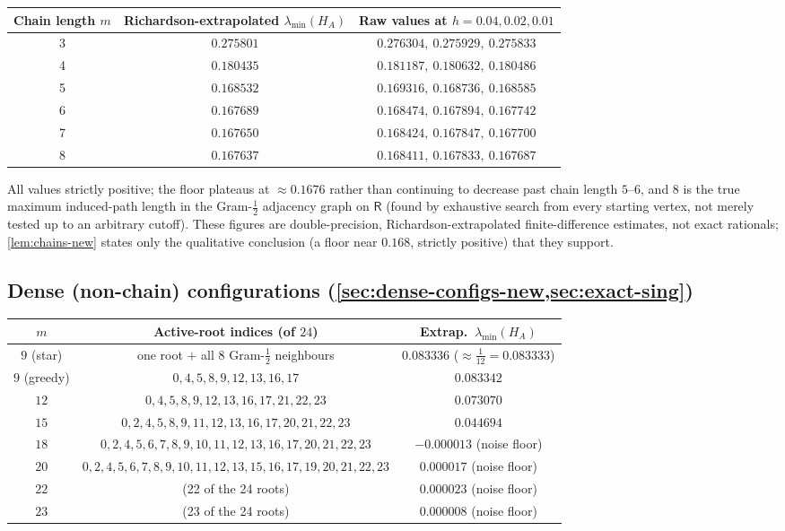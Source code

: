 \documentclass[11pt,reqno]{amsart}
\renewcommand{\_}{\origunderscore\allowbreak}
\numberwithin{equation}{section}
\theoremstyle{plain}
\theoremstyle{definition}
\theoremstyle{remark}
\newcommand{\Rt}{\mathsf{R}}                 %
\begin{document}
\begin{center}
\renewcommand{\arraystretch}{1.2}
\begin{tabular}{ccc}
\toprule
Chain length $m$ & Richardson-extrapolated $\lambda_{\min}(H_A)$ & Raw values at $h=0.04,0.02,0.01$\\
\midrule
3 & $0.275801$ & $0.276304,\ 0.275929,\ 0.275833$\\
4 & $0.180435$ & $0.181187,\ 0.180632,\ 0.180486$\\
5 & $0.168532$ & $0.169316,\ 0.168736,\ 0.168585$\\
6 & $0.167689$ & $0.168474,\ 0.167894,\ 0.167742$\\
7 & $0.167650$ & $0.168424,\ 0.167847,\ 0.167700$\\
8 & $0.167637$ & $0.168411,\ 0.167833,\ 0.167687$\\
\bottomrule
\end{tabular}
\end{center}

All values strictly positive; the floor plateaus at $\approx0.1676$
rather than continuing to decrease past chain length $5$--$6$, and $8$
is the true maximum induced-path length in the Gram-$\tfrac12$
adjacency graph on $\Rt$ (found by exhaustive search from every
starting vertex, not merely tested up to an arbitrary cutoff). These
figures are double-precision, Richardson-extrapolated finite-difference
estimates, not exact rationals; \cref{lem:chains-new} states only the
qualitative conclusion (a floor near $0.168$, strictly positive) that
they support.

\subsection{Dense (non-chain) configurations (\cref{sec:dense-configs-new,sec:exact-sing})}

\begin{center}
\footnotesize
\renewcommand{\arraystretch}{1.2}
\setlength{\tabcolsep}{4pt}
\begin{tabular}{ccc}
\toprule
$m$ & Active-root indices (of $24$) & Extrap.\ $\lambda_{\min}(H_A)$\\
\midrule
$9$ (star) & one root $+$ all $8$ Gram-$\tfrac12$ neighbours & $0.083336$ ($\approx\tfrac1{12}=0.083333$)\\
$9$ (greedy) & $0,4,5,8,9,12,13,16,17$ & $0.083342$\\
$12$ & $0,4,5,8,9,12,13,16,17,21,22,23$ & $0.073070$\\
$15$ & $0,2,4,5,8,9,11,12,13,16,17,20,21,22,23$ & $0.044694$\\
$18$ & $0,2,4,5,6,7,8,9,10,11,12,13,16,17,20,21,22,23$ & $-0.000013$ (noise floor)\\
$20$ & $0,2,4,5,6,7,8,9,10,11,12,13,15,16,17,19,20,21,22,23$ & $0.000017$ (noise floor)\\
$22$ & (22 of the 24 roots) & $0.000023$ (noise floor)\\
$23$ & (23 of the 24 roots) & $0.000008$ (noise floor)\\
\bottomrule
\end{tabular}
\end{center}
\end{document}
